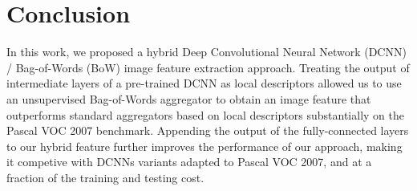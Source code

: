 \documentclass{article}
\begin{document}
\section{Conclusion}\label{conclusion}
In this work, we proposed a hybrid Deep Convolutional Neural Network (DCNN) / Bag-of-Words (BoW) image feature extraction approach. Treating the output of intermediate layers of a pre-trained DCNN as local descriptors allowed us to use an unsupervised  Bag-of-Words aggregator to obtain an image feature that outperforms standard aggregators based on local descriptors substantially on the Pascal VOC 2007 benchmark. Appending the output of the fully-connected layers to our hybrid feature further improves the performance of our approach, making it competive with DCNNs variants adapted to Pascal VOC 2007, and at a fraction of the training and testing cost.






%

\end{document}
